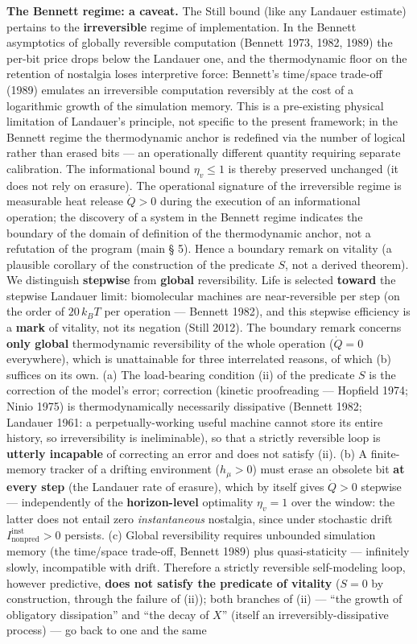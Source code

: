 \documentclass[pdflatex,sn-mathphys-ay]{sn-jnl}
\begin{document}
\textbf{The Bennett regime: a caveat.} The Still bound (like any Landauer estimate) pertains to the \textbf{irreversible} regime of implementation. In the Bennett asymptotics of globally reversible computation (Bennett 1973, 1982, 1989) the per-bit price drops below the Landauer one, and the thermodynamic floor on the retention of nostalgia loses interpretive force: Bennett's time/space trade-off (1989) emulates an irreversible computation reversibly at the cost of a logarithmic growth of the simulation memory. This is a pre-existing physical limitation of Landauer's principle, not specific to the present framework; in the Bennett regime the thermodynamic anchor is redefined via the number of logical rather than erased bits --- an operationally different quantity requiring separate calibration. The informational bound \(\eta_v \le 1\) is thereby preserved unchanged (it does not rely on erasure). The operational signature of the irreversible regime is measurable heat release \(\dot Q > 0\) during the execution of an informational operation; the discovery of a system in the Bennett regime indicates the boundary of the domain of definition of the thermodynamic anchor, not a refutation of the program (main § 5). Hence a boundary remark on vitality (a plausible corollary of the construction of the predicate \(S\), not a derived theorem). We distinguish \textbf{stepwise} from \textbf{global} reversibility. Life is selected \textbf{toward} the stepwise Landauer limit: biomolecular machines are near-reversible per step (on the order of \(20\,k_B T\) per operation --- Bennett 1982), and this stepwise efficiency is a \textbf{mark} of vitality, not its negation (Still 2012). The boundary remark concerns \textbf{only global} thermodynamic reversibility of the whole operation (\(\dot Q = 0\) everywhere), which is unattainable for three interrelated reasons, of which (b) suffices on its own. (a) The load-bearing condition (ii) of the predicate \(S\) is the correction of the model's error; correction (kinetic proofreading --- Hopfield 1974; Ninio 1975) is thermodynamically necessarily dissipative (Bennett 1982; Landauer 1961: a perpetually-working useful machine cannot store its entire history, so irreversibility is ineliminable), so that a strictly reversible loop is \textbf{utterly incapable} of correcting an error and does not satisfy (ii). (b) A finite-memory tracker of a drifting environment (\(h_\mu > 0\)) must erase an obsolete bit \textbf{at every step} (the Landauer rate of erasure), which by itself gives \(\dot Q > 0\) stepwise --- independently of the \textbf{horizon-level} optimality \(\eta_v = 1\) over the window: the latter does not entail zero \emph{instantaneous} nostalgia, since under stochastic drift \(I_{\text{nonpred}}^{\text{inst}} > 0\) persists. (c) Global reversibility requires unbounded simulation memory (the time/space trade-off, Bennett 1989) plus quasi-staticity --- infinitely slowly, incompatible with drift. Therefore a strictly reversible self-modeling loop, however predictive, \textbf{does not satisfy the predicate of vitality} (\(S = 0\) by construction, through the failure of (ii)); both branches of (ii) --- ``the growth of obligatory dissipation'' and ``the decay of \(X\)'' (itself an irreversibly-dissipative process) --- go back to one and the same 
\end{document}
